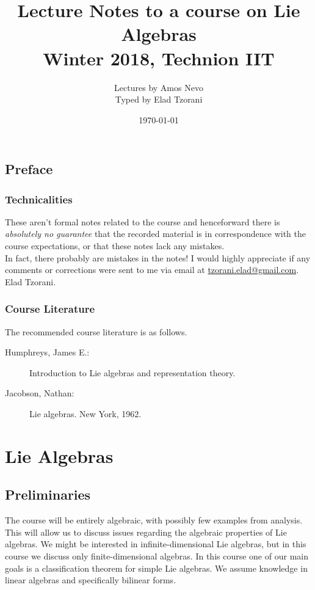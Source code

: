 \documentclass[10pt,a4paper,twoside,openany,hidelinks]{book}
\title{Lecture Notes to a course on Lie Algebras \\ \large{Winter 2018, Technion IIT}}
\author{Lectures by Amos Nevo \\ \large Typed by Elad Tzorani}
\date{\today}
\begin{document}
\frontmatter
{}
\tableofcontents
\countlectures
\newpage

\chapter*{Preface}
 

\section*{Technicalities}

These aren't formal notes related to the course and henceforward there is \emph{absolutely no guarantee} that the recorded material is in correspondence with the course expectations, or that these notes lack any mistakes.\\
In fact, there probably are mistakes in the notes! I would highly appreciate if any comments or corrections were sent to me via email at \href{mailto:tzorani.elad@gmail.com}{tzorani.elad@gmail.com}.\\
Elad Tzorani.

\section*{Course Literature}

The recommended course literature is as follows.

\begin{description}
\item[Humphreys, James E.:] Introduction to Lie algebras and representation theory.

\item[Jacobson, Nathan:] Lie algebras. New York, 1962.
\end{description}

\mainmatter

\part{Lie Algebras}
\chapter{Preliminaries}

The course will be entirely algebraic, with possibly few examples from analysis. This will allow us to discuss issues regarding the algebraic properties of Lie algebras.
We might be interested in infinite-dimensional Lie algebras, but in this course we discuss only finite-dimensional algebras.
In this course one of our main goals is a classification theorem for simple Lie algebras.
We assume knowledge in linear algebras and specifically bilinear forms.
\end{document}
